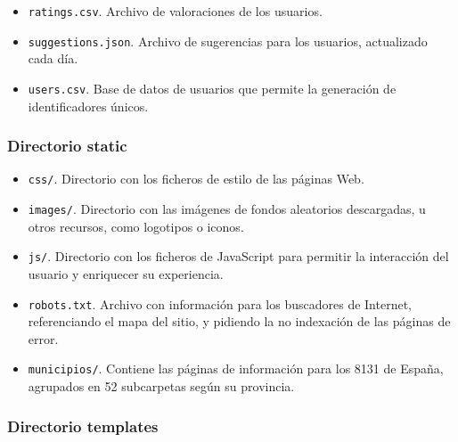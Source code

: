 \begin{itemize}
	\item \texttt{ratings.csv}. Archivo de valoraciones de los usuarios.
	\item \texttt{suggestions.json}. Archivo de sugerencias para los usuarios, actualizado cada día.
	\item \texttt{users.csv}. Base de datos de usuarios que permite la generación de identificadores únicos.

\end{itemize}

\subsubsection{Directorio \guillemotleft static\guillemotright\space}

\begin{itemize}
	\item \texttt{css/}. Directorio con los ficheros de estilo de las páginas Web.
	\item \texttt{images/}. Directorio con las imágenes de fondos aleatorios descargadas, u otros recursos, como logotipos o iconos.
	\item \texttt{js/}. Directorio con los ficheros de JavaScript para permitir la interacción del usuario y enriquecer su experiencia.
	\item \texttt{robots.txt}. Archivo con información para los buscadores de Internet, referenciando el mapa del sitio, y pidiendo la no indexación de las páginas de error.
    \item \texttt{municipios/}. Contiene las páginas de información para los 8131 de España, agrupados en 52 subcarpetas según su provincia.

\end{itemize}

\subsubsection{Directorio \guillemotleft templates\guillemotright\space}

